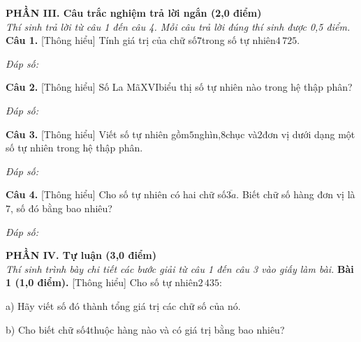 \documentclass[11pt,a4paper]{article}
\begin{document}
\vspace{6pt}
\noindent
\textbf{\large PHẦN III. Câu trắc nghiệm trả lời ngắn (2,0 điểm)}\\
\textit{\small Thí sinh trả lời từ câu 1 đến câu 4. Mỗi câu trả lời đúng thí sinh được 0,5 điểm.}
\vspace{6pt}
\noindent\textbf{Câu 1.} [Thông hiểu] Tính giá trị của chữ số$7$trong số tự nhiên$4\,725$.\par\vspace{2pt}
\noindent\textit{Đáp số:} \dotfill\par\vspace{6pt}

\noindent\textbf{Câu 2.} [Thông hiểu] Số La Mã$\mathrm{XVI}$biểu thị số tự nhiên nào trong hệ thập phân?\par\vspace{2pt}
\noindent\textit{Đáp số:} \dotfill\par\vspace{6pt}

\noindent\textbf{Câu 3.} [Thông hiểu] Viết số tự nhiên gồm$5$nghìn,$8$chục và$2$đơn vị dưới dạng một số tự nhiên trong hệ thập phân.\par\vspace{2pt}
\noindent\textit{Đáp số:} \dotfill\par\vspace{6pt}

\noindent\textbf{Câu 4.} [Thông hiểu] Cho số tự nhiên có hai chữ số$\overline{3a}$. Biết chữ số hàng đơn vị là$7$, số đó bằng bao nhiêu?\par\vspace{2pt}
\noindent\textit{Đáp số:} \dotfill\par\vspace{6pt}


\vspace{6pt}
\noindent
\textbf{\large PHẦN IV. Tự luận (3,0 điểm)}\\
\textit{\small Thí sinh trình bày chi tiết các bước giải từ câu 1 đến câu 3 vào giấy làm bài.}
\vspace{6pt}
\noindent\textbf{Bài 1 (1,0 điểm).} [Thông hiểu] Cho số tự nhiên$2\,435$:\par\noindent a) Hãy viết số đó thành tổng giá trị các chữ số của nó.\par\noindent b) Cho biết chữ số$4$thuộc hàng nào và có giá trị bằng bao nhiêu?\par\vspace{8pt}
\end{document}

